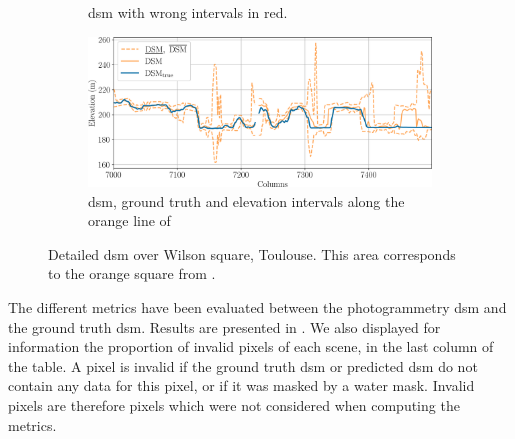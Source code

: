 \begin{figure}
\begin{subfigure}[t]{0.49\linewidth}
        \caption{\acrshort{dsm} with wrong intervals in red.}
        \label{fig:toulouse_error_zoom}
    \end{subfigure}
    \begin{subfigure}[t]{\linewidth}
        \centering
        \includegraphics[width=\linewidth]{Images/Chap_6/Toulouse_row_4720.png}
        \caption{\acrshort{dsm}, ground truth and elevation intervals along the orange line of }
        \label{fig:toulouse_zoom_row}
    \end{subfigure}
    \caption{Detailed \acrshort{dsm} over Wilson square, Toulouse. This area corresponds to the orange square from .}
    \label{fig:toulouse_zoom}
\end{figure}


The different metrics have been evaluated between the photogrammetry \acrshort{dsm} and the ground truth \acrshort{dsm}. Results are presented in . We also displayed for information the proportion of invalid pixels of each scene, in the last column of the table. A pixel is invalid if the ground truth \acrshort{dsm} or predicted \acrshort{dsm} do not contain any data for this pixel, or if it was masked by a water mask. Invalid pixels are therefore pixels which were not considered when computing the metrics.

